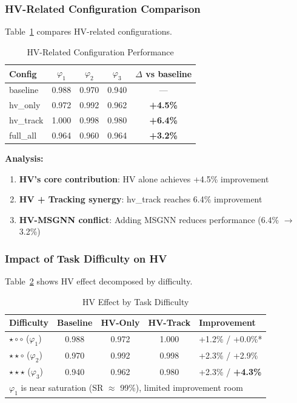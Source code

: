 \documentclass[conference]{IEEEtran}
\begin{document}
\subsubsection{HV-Related Configuration Comparison}

Table~\ref{tab:hv_comparison} compares HV-related configurations.

\begin{table}[t]
\centering
\caption{HV-Related Configuration Performance}
\label{tab:hv_comparison}
\begin{tabular}{@{}lcccc@{}}
\toprule
\textbf{Config} & \textbf{$\varphi_1$} & \textbf{$\varphi_2$} & \textbf{$\varphi_3$} & \textbf{$\Delta$ vs baseline} \\ \midrule
baseline & 0.988 & 0.970 & 0.940 & --- \\
hv\_only & 0.972 & 0.992 & 0.962 & \textbf{+4.5\%} \\
hv\_track & 1.000 & 0.998 & 0.980 & \textbf{+6.4\%} \\
full\_all & 0.964 & 0.960 & 0.964 & \textbf{+3.2\%} \\ \bottomrule
\end{tabular}
\end{table}

\textbf{Analysis:}
\begin{enumerate}
    \item \textbf{HV's core contribution}: HV alone achieves +4.5\% improvement
    \item \textbf{HV + Tracking synergy}: hv\_track reaches 6.4\% improvement
    \item \textbf{HV-MSGNN conflict}: Adding MSGNN reduces performance (6.4\% $\rightarrow$ 3.2\%)
\end{enumerate}

\subsubsection{Impact of Task Difficulty on HV}

Table~\ref{tab:difficulty_impact} shows HV effect decomposed by difficulty.

\begin{table}[t]
\centering
\caption{HV Effect by Task Difficulty}
\label{tab:difficulty_impact}
\begin{tabular}{@{}lcccl@{}}
\toprule
\textbf{Difficulty} & \textbf{Baseline} & \textbf{HV-Only} & \textbf{HV-Track} & \textbf{Improvement} \\ \midrule
$\star\circ\circ$ ($\varphi_1$) & 0.988 & 0.972 & 1.000 & +1.2\% / +0.0\%* \\
$\star\star\circ$ ($\varphi_2$) & 0.970 & 0.992 & 0.998 & +2.3\% / +2.9\% \\
$\star\star\star$ ($\varphi_3$) & 0.940 & 0.962 & 0.980 & +2.3\% / \textbf{+4.3\%} \\ \bottomrule
\multicolumn{5}{l}{\footnotesize *$\varphi_1$ is near saturation (SR $\approx$ 99\%), limited improvement room}
\end{tabular}
\end{table}
\end{document}
